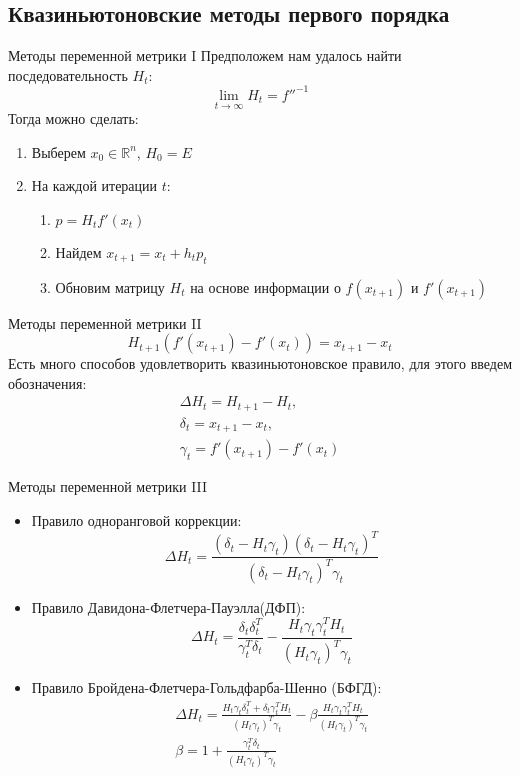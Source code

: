 \documentclass[14pt, fleqn, xcolor={dvipsnames, table}]{beamer}
\begin{document}
\subsection{Квазиньютоновские методы первого порядка}

\begin{frame}{Методы переменной метрики I}
\small
Предположем нам удалось найти посдедовательность $H_t$:
$$\lim_{t \to \infty} H_t = f''^{-1}$$
Тогда можно сделать:
\begin{enumerate}
  \item Выберем $x_0 \in \mathbb{R}^n$, $H_0 = E$
  \item На каждой итерации $t$:
  \begin{enumerate}
    \item $p = H_t f'(x_t)$
    \item Найдем $x_{t+1} = x_t + h_t p_t$
    \item Обновим матрицу $H_t$ на основе информации о $f(x_{t+1})$ и $f'(x_{t+1})$
  \end{enumerate}
\end{enumerate}
\end{frame}

\begin{frame}{Методы переменной метрики II}
$$
H_{t+1} \left(f'(x_{t+1}) - f'(x_t)\right) = x_{t+1} - x_{t}
$$
\small
Есть много способов удовлетворить квазиньютоновское правило, для этого введем обозначения:
$$\begin{array}{l}
  \Delta H_t = H_{t+1} - H_t,\\
  \delta_t = x_{t+1} - x_t,\\
  \gamma_t = f'(x_{t+1}) - f'(x_t)
\end{array}$$
\end{frame}
\begin{frame}{Методы переменной метрики III}
\begin{itemize}
  \item Правило одноранговой коррекции:
  $$
    \Delta H_t = \frac{(\delta_t - H_t\gamma_t)(\delta_t - H_t\gamma_t)^T}{(\delta_t - H_t\gamma_t)^T\gamma_t}
  $$
  \item Правило Давидона-Флетчера-Пауэлла(ДФП):
  $$
    \Delta H_t = \frac{\delta_t\delta_{t}^{T}}{\gamma_{t}^{T}\delta_t} - \frac{H_t\gamma_t\gamma_{t}^{T}H_t}{(H_t\gamma_t)^T\gamma_t}
  $$
  \item Правило Бройдена-Флетчера-Гольдфарба-Шенно (БФГД):
  $$\begin{array}{l}
    \Delta H_t = \frac{H_t\gamma_t\delta_{t}^{T} + \delta_t\gamma_{t}^{T}H_t}{(H_t\gamma_t)^T\gamma_t} - \beta\frac{H_t\gamma_t\gamma_{t}^{T}H_t}{(H_t\gamma_t)^T\gamma_t} \\
    \beta = 1 + \frac{\gamma_{t}^{T}\delta_t}{(H_t\gamma_t)^T\gamma_t}
  \end{array}$$
\end{itemize}
\end{frame}
\end{document}
